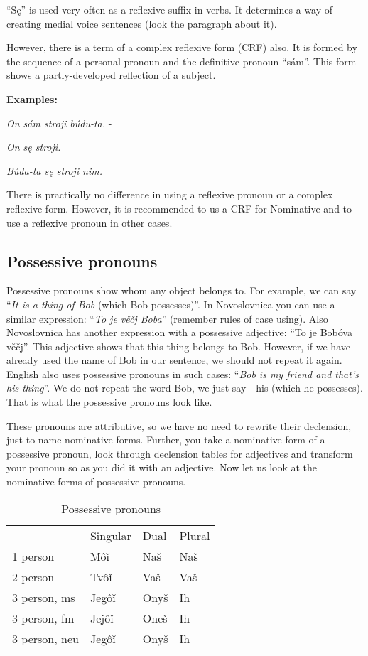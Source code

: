 “Sę” is used very often as a reflexive suffix in verbs. It determines a way of creating medial voice sentences (look the paragraph about it).

However, there is a term of a complex reflexive form (CRF) also. It is formed by the sequence of a personal pronoun and the definitive pronoun “sám”. This form shows a partly-developed reflection of a subject.  

\textbf{Examples:}

\textit{On sám stroji búdu-ta.} -

\textit{On sę stroji.}

\textit{Búda-ta sę stroji nim.}

There is practically no difference in using a reflexive pronoun or a complex reflexive form. However, it is recommended to us a CRF for Nominative and to use a reflexive pronoun in other cases.

\subsection{Possessive pronouns}

Possessive pronouns show whom any object belongs to. For example, we can say “\textit{It is a thing of Bob} (which Bob possesses)”. In Novoslovnica you can use a similar expression: “\textit{To je věčj Boba}” (remember rules of case using). Also Novoslovnica has another expression with a possessive adjective: “To je Bobóva věčj”. This adjective shows that this thing belongs to Bob. However, if we have already used the name of Bob in our sentence, we should not repeat it again. English also uses possessive pronouns in such cases: “\textit{Bob is my friend and that’s his thing}”. We do not repeat the word Bob, we just say - his (which he possesses). That is what the possessive pronouns look like.

These pronouns are attributive, so we have no need to rewrite their declension, just to name nominative forms. Further, you take a nominative form of a possessive pronoun, look through declension tables for adjectives and transform your pronoun so as you did it with an adjective. Now let us look at the nominative forms of possessive pronouns.

\begin{table}[!htb]
	\caption{Possessive pronouns}
	\begin{tabular}{llll}
		& Singular & Dual & Plural \\
		1 person & Môǐ & Naš & Naš \\
		2 person & Tvôǐ & Vaš & Vaš \\
		3 person, ms & Jegôǐ & Onyš & Ih \\
		3 person, fm & Jejôǐ & Oneš & Ih \\
		3 person, neu & Jegôǐ & Onyš & Ih
	\end{tabular}
\end{table}

